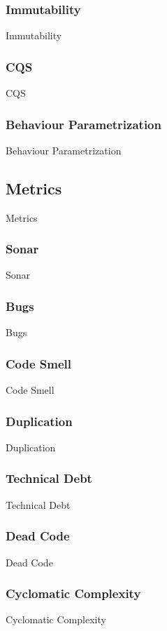 \subsubsection{Immutability}
Immutability

\subsubsection{CQS}
CQS

\subsubsection{Behaviour Parametrization}
Behaviour Parametrization


\subsection{Metrics}\label{subsec:metrics}
Metrics

\subsubsection{Sonar}
Sonar

\subsubsection{Bugs}
Bugs

\subsubsection{Code Smell}
Code Smell

\subsubsection{Duplication}
Duplication

\subsubsection{Technical Debt}
Technical Debt

\subsubsection{Dead Code}
Dead Code

\subsubsection{Cyclomatic Complexity}
Cyclomatic Complexity



